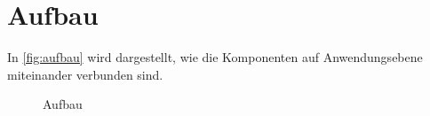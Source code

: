\section{Aufbau}\label{sec:aufbau}

In \autoref{fig:aufbau} wird dargestellt, wie die Komponenten auf Anwendungsebene miteinander verbunden sind.


\begin{figure}[ht]
    \centering
    \resizebox{\textwidth}{!}{
        
    }
    \caption{Aufbau}
    \label{fig:aufbau}
\end{figure}